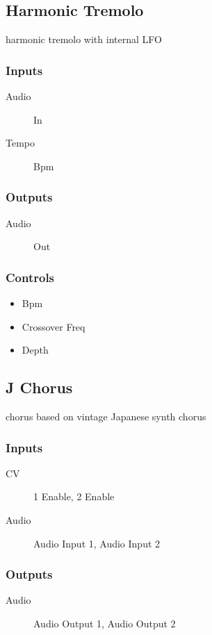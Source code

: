 \subsection{Harmonic Tremolo}

harmonic tremolo with internal LFO



\subsubsection{Inputs}
\begin{description}
\item [Audio] In
\item [Tempo] Bpm
\end{description}

\subsubsection{Outputs}
\begin{description}
\item [Audio] Out
\end{description}

\subsubsection{Controls}
\begin{itemize}
\item Bpm
\item Crossover Freq
\item Depth
\end{itemize}

\subsection{J Chorus}

chorus based on vintage Japanese synth chorus



\subsubsection{Inputs}
\begin{description}
\item [CV] 1 Enable, 2 Enable
\item [Audio] Audio Input 1, Audio Input 2
\end{description}

\subsubsection{Outputs}
\begin{description}
\item [Audio] Audio Output 1, Audio Output 2
\end{description}

